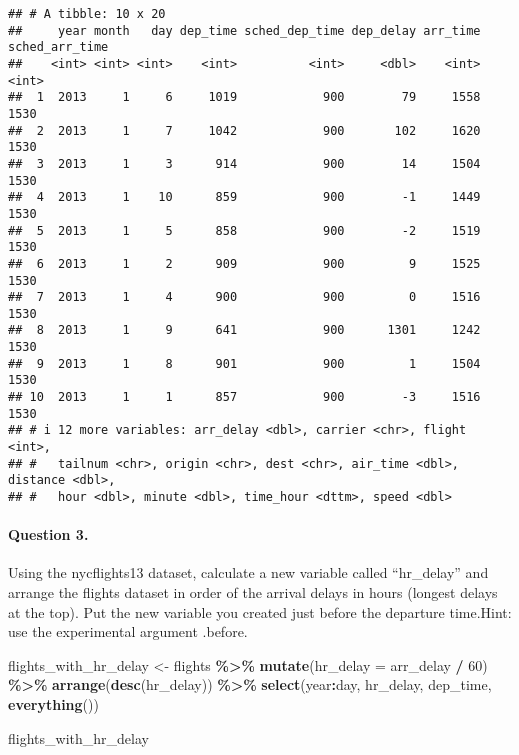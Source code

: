 \documentclass[
]{article}
\newenvironment{Shaded}{\begin{snugshade}}{\end{snugshade}}
\newcommand{\AttributeTok}[1]{\textcolor[rgb]{0.13,0.29,0.53}{#1}}
\newcommand{\DecValTok}[1]{\textcolor[rgb]{0.00,0.00,0.81}{#1}}
\newcommand{\FunctionTok}[1]{\textcolor[rgb]{0.13,0.29,0.53}{\textbf{#1}}}
\newcommand{\NormalTok}[1]{#1}
\newcommand{\OtherTok}[1]{\textcolor[rgb]{0.56,0.35,0.01}{#1}}
\newcommand{\SpecialCharTok}[1]{\textcolor[rgb]{0.81,0.36,0.00}{\textbf{#1}}}
\begin{document}
\begin{verbatim}
## # A tibble: 10 x 20
##     year month   day dep_time sched_dep_time dep_delay arr_time sched_arr_time
##    <int> <int> <int>    <int>          <int>     <dbl>    <int>          <int>
##  1  2013     1     6     1019            900        79     1558           1530
##  2  2013     1     7     1042            900       102     1620           1530
##  3  2013     1     3      914            900        14     1504           1530
##  4  2013     1    10      859            900        -1     1449           1530
##  5  2013     1     5      858            900        -2     1519           1530
##  6  2013     1     2      909            900         9     1525           1530
##  7  2013     1     4      900            900         0     1516           1530
##  8  2013     1     9      641            900      1301     1242           1530
##  9  2013     1     8      901            900         1     1504           1530
## 10  2013     1     1      857            900        -3     1516           1530
## # i 12 more variables: arr_delay <dbl>, carrier <chr>, flight <int>,
## #   tailnum <chr>, origin <chr>, dest <chr>, air_time <dbl>, distance <dbl>,
## #   hour <dbl>, minute <dbl>, time_hour <dttm>, speed <dbl>
\end{verbatim}

\hypertarget{question-3.}{%
\paragraph{Question 3.}\label{question-3.}}

Using the nycflights13 dataset, calculate a new variable called
``hr\_delay'' and arrange the flights dataset in order of the arrival
delays in hours (longest delays at the top). Put the new variable you
created just before the departure time.Hint: use the experimental
argument .before.

\begin{Shaded}
\begin{Highlighting}[]
\NormalTok{flights\_with\_hr\_delay }\OtherTok{\textless{}{-}}\NormalTok{ flights }\SpecialCharTok{\%\textgreater{}\%}
  \FunctionTok{mutate}\NormalTok{(}\AttributeTok{hr\_delay =}\NormalTok{ arr\_delay }\SpecialCharTok{/} \DecValTok{60}\NormalTok{) }\SpecialCharTok{\%\textgreater{}\%}
  \FunctionTok{arrange}\NormalTok{(}\FunctionTok{desc}\NormalTok{(hr\_delay)) }\SpecialCharTok{\%\textgreater{}\%}
  \FunctionTok{select}\NormalTok{(year}\SpecialCharTok{:}\NormalTok{day, hr\_delay, dep\_time, }\FunctionTok{everything}\NormalTok{())}

\NormalTok{flights\_with\_hr\_delay}
\end{Highlighting}
\end{Shaded}
\end{document}
